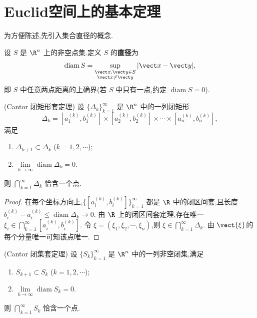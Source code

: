 \section{Euclid空间上的基本定理}

为方便陈述,先引入集合直径的概念.

\begin{definition}
设 $S$ 是 $\R^n$ 上的非空点集.定义 $S$ 的\textbf{直径}为
\[
\operatorname{diam} S=\sup_{\substack{\vect x,\vect y\in S\\\vect x\neq\vect y}}|\vect x-\vect y|,
\]
即 $S$ 中任意两点距离的上确界(若 $S$ 中只有一点,约定 $\operatorname{diam} S=0$).
\end{definition}

\begin{theorem}\label{Cantor闭矩形套定理}(Cantor 闭矩形套定理)
设 $\{\Delta_k\}_{k=1}^\infty$ 是 $\R^n$ 中的一列闭矩形
\[
\Delta_k=[a_1^{(k)},b_1^{(k)}]\times[a_2^{(k)},b_2^{(k)}]\times\cdots\times[a_n^{(k)},b_n^{(k)}],
\]
满足
\begin{enumerate}[label={(\arabic*)}]
\item $\Delta_{k+1}\subset\Delta_k$ ($k=1,2,\cdots$);
\item $\lim\limits_{k\to\infty}\operatorname{diam}\Delta_k=0$.
\end{enumerate}
则 $\bigcap\limits_{k=1}^\infty\Delta_k$ 恰含一个点.
\end{theorem}

\begin{proof}
在每个坐标方向上,$\{[a_i^{(k)},b_i^{(k)}]\}_{k=1}^\infty$ 都是 $\R$ 中的闭区间套,且长度 $b_i^{(k)}-a_i^{(k)}\leq\operatorname{diam}\Delta_k\to0$. 由 $\R$ 上的闭区间套定理,存在唯一 $\xi_i\in\bigcap\limits_{k=1}^\infty[a_i^{(k)},b_i^{(k)}]$. 令 $\xi=(\xi_1,\xi_2,\cdots,\xi_n)$,则 $\xi\in\bigcap\limits_{k=1}^\infty\Delta_k$. 由 $\vect{\xi}$的每个分量唯一可知该点唯一.
\end{proof}

\begin{theorem}\label{Cantor闭集套定理}(Cantor 闭集套定理)
设 $\{S_k\}_{k=1}^\infty$ 是 $\R^n$ 中的一列非空闭集,满足
\begin{enumerate}[label={(\arabic*)}]
\item $S_{k+1}\subset S_k$ ($k=1,2,\cdots$);
\item $\lim\limits_{k\to\infty}\operatorname{diam} S_k=0$.
\end{enumerate}
则 $\bigcap\limits_{k=1}^\infty S_k$ 恰含一个点.
\end{theorem}

